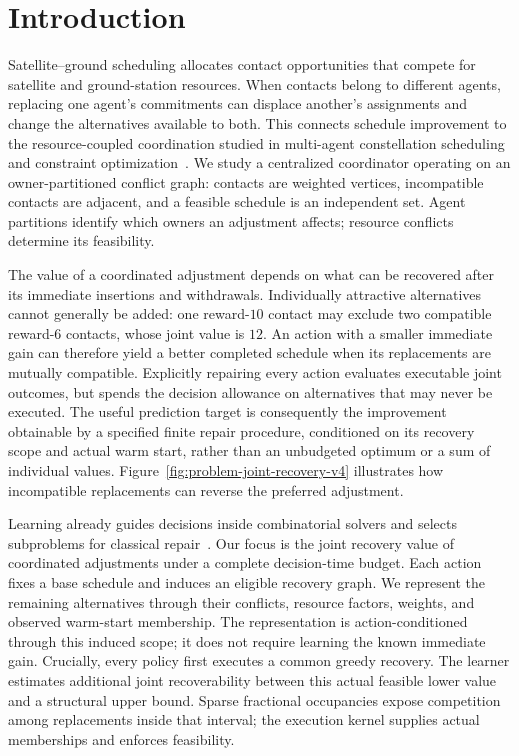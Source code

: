 \section{Introduction}
\label{sec:introduction}

Satellite--ground scheduling allocates contact opportunities that compete
for satellite and ground-station resources. When contacts belong to
different agents, replacing one agent's commitments can displace another's
assignments and change the alternatives available to both. This connects
schedule improvement to the resource-coupled coordination studied in
multi-agent constellation scheduling~\cite{picard2022satellite} and
constraint optimization~\cite{fioretto2018}. We study a centralized
coordinator operating on an owner-partitioned conflict graph: contacts are
weighted vertices, incompatible contacts are adjacent, and a feasible
schedule is an independent set. Agent partitions identify which owners an
adjustment affects; resource conflicts determine its feasibility.

The value of a coordinated adjustment depends on what can be recovered
after its immediate insertions and withdrawals. Individually attractive
alternatives cannot generally be added: one reward-$10$ contact may exclude
two compatible reward-$6$ contacts, whose joint value is $12$. An action
with a smaller immediate gain can therefore yield a better completed
schedule when its replacements are mutually compatible. Explicitly repairing
every action evaluates executable joint outcomes, but spends the
decision allowance on alternatives that may never be executed. The useful
prediction target is consequently the improvement obtainable by a specified
finite repair procedure, conditioned on its recovery scope and actual warm
start, rather than an unbudgeted optimum or a sum of individual values.
Figure~\ref{fig:problem-joint-recovery-v4} illustrates how incompatible
replacements can reverse the preferred adjustment.



Learning already guides decisions inside combinatorial solvers and selects
subproblems for classical repair~\cite{gasse2019branching,li2021delegate}.
Our focus is the joint recovery value of coordinated adjustments under a
complete decision-time budget. Each action fixes a base schedule and induces
an eligible recovery graph. We represent the remaining alternatives through
their conflicts, resource factors, weights, and observed warm-start
membership. The representation is action-conditioned through this induced
scope; it does not require learning the known immediate gain. Crucially,
every policy first executes a common greedy recovery. The learner estimates
additional joint recoverability between this actual feasible lower value and
a structural upper bound. Sparse fractional occupancies expose competition
among replacements inside that interval; the execution kernel supplies
actual memberships and enforces feasibility.

